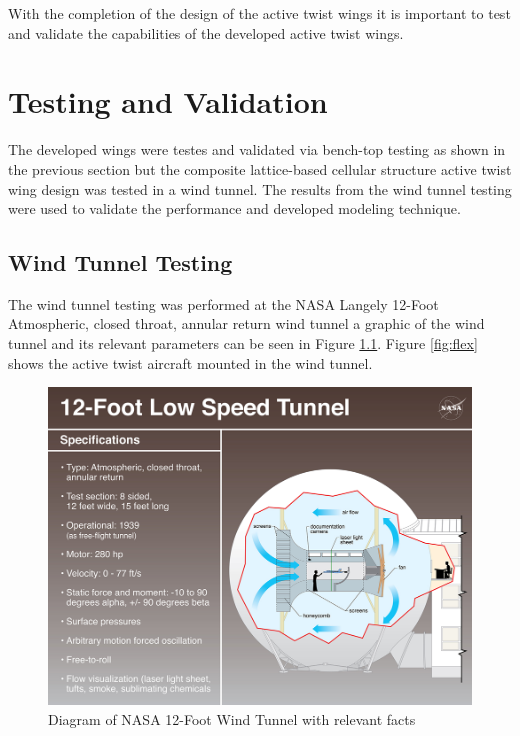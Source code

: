 \documentclass[11pt]{ucthesis}
\begin{document}
With the completion of the design of the active twist wings it is important to test and validate the capabilities of the developed active twist wings.

\chapter{Testing and Validation}

The developed wings were testes and validated via bench-top testing as shown in the previous section but the composite lattice-based cellular structure active twist wing design was tested in a wind tunnel. The results from the wind tunnel testing were used to validate the performance and developed modeling technique.

\section{Wind Tunnel Testing}
The wind tunnel testing was performed at the NASA Langely 12-Foot Atmospheric, closed throat, annular return wind tunnel a graphic of the wind tunnel and its relevant parameters can be seen in Figure \ref{fig:windTunnel}. Figure \ref{fig:flex} shows the active twist aircraft mounted in the wind tunnel.

\begin{figure}[thpb]
\centering
\includegraphics[width=1\linewidth]{Figures/12FootWindTunnel.png}
\caption{Diagram of NASA 12-Foot Wind Tunnel with relevant facts}
\label{fig:windTunnel}
\end{figure}
\end{document}
